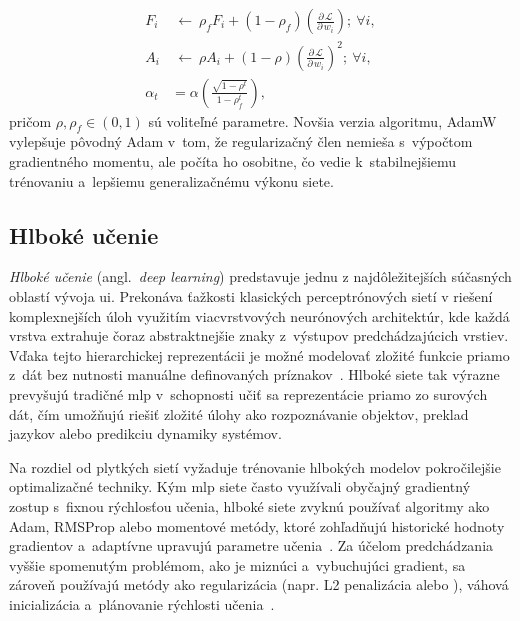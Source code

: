       \begin{subequations}
        \begin{align}
          F_i &\:\leftarrow\: \rho_f F_i + (1 - \rho_f) \left( \frac{\partial\, \mathcal{L}}{\partial\, w_i} \right);\ \forall i, \\
          A_i &\:\leftarrow\: \rho A_i + (1 - \rho) {\left( \frac{\partial\, \mathcal{L}}{\partial\, w_i} \right)}^2;\ \forall i, \\
          \alpha_t &= \alpha \left( \frac{\sqrt{1 - \rho^t}}{1 - \rho_f^t} \right),
        \end{align}
      \end{subequations}
      pričom $\rho, \rho_f \in (0,1)$ sú voliteľné parametre. Novšia verzia algoritmu, AdamW~\cite{loshchilovDecoupledWeightDecay2019} vylepšuje pôvodný Adam v~tom, že regularizačný člen nemieša s~výpočtom gradientného momentu, ale počíta ho osobitne, čo vedie k~stabilnejšiemu trénovaniu a~lepšiemu generalizačnému výkonu siete.
  
\subsection{Hlboké učenie}

  \emph{Hlboké učenie} (angl.\ \emph{deep learning}) predstavuje jednu z najdôležitejších súčasných oblastí vývoja \acrshort{ui}. Prekonáva ťažkosti klasických perceptrónových sietí v riešení komplexnejších úloh využitím viacvrstvových neurónových architektúr, kde každá vrstva extrahuje čoraz abstraktnejšie znaky z~výstupov predchádzajúcich vrstiev. Vďaka tejto hierarchickej reprezentácii je možné modelovať zložité funkcie priamo z~dát bez nutnosti manuálne definovaných príznakov~\cite{lecunDeepLearning2015}. Hlboké siete tak výrazne prevyšujú tradičné \acrshort{mlp} v~schopnosti učiť sa reprezentácie priamo zo surových dát, čím umožňujú riešiť zložité úlohy ako rozpoznávanie objektov, preklad jazykov alebo predikciu dynamiky systémov.

  Na rozdiel od plytkých sietí vyžaduje trénovanie hlbokých modelov pokročilejšie optimalizačné techniky. Kým \acrshort{mlp} siete často využívali obyčajný gradientný zostup s~fixnou rýchlosťou učenia, hlboké siete zvyknú používať algoritmy ako Adam, RMSProp alebo momentové metódy, ktoré zohľadňujú historické hodnoty gradientov a~adaptívne upravujú parametre učenia~\cite{kingmaAdamMethodStochastic2017}. Za účelom predchádzania vyššie spomenutým problémom, ako je miznúci a~vybuchujúci gradient, sa zároveň používajú metódy ako regularizácia (napr. L2 penalizácia alebo ), váhová inicializácia a~plánovanie rýchlosti učenia~\cite{goodfellowDeepLearning2016}.

